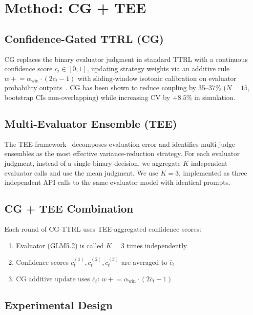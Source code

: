 \documentclass[11pt]{article}
\begin{document}
\section{Method: CG + TEE}

\subsection{Confidence-Gated TTRL (CG)}

CG replaces the binary evaluator judgment in standard TTRL with a continuous confidence score $c_t \in [0,1]$, updating strategy weights via an additive rule $w \mathrel{+}= \alpha_{\text{win}} \cdot (2c_t - 1)$ with sliding-window isotonic calibration on evaluator probability outputs~\cite{liu2026caleffects}. CG has been shown to reduce coupling by 35--37\% ($N{=}15$, bootstrap CIs non-overlapping) while increasing CV by $+8.5\%$ in simulation.

\subsection{Multi-Evaluator Ensemble (TEE)}

The TEE framework~\cite{messing2026tee} decomposes evaluation error and identifies multi-judge ensembles as the most effective variance-reduction strategy. For each evaluator judgment, instead of a single binary decision, we aggregate $K$ independent evaluator calls and use the mean judgment. We use $K{=}3$, implemented as three independent API calls to the same evaluator model with identical prompts.

\subsection{CG + TEE Combination}

Each round of CG-TTRL uses TEE-aggregated confidence scores:
\begin{enumerate}[leftmargin=*,nosep]
 \item Evaluator (GLM5.2) is called $K{=}3$ times independently
 \item Confidence scores $c_t^{(1)}, c_t^{(2)}, c_t^{(3)}$ are averaged to $\bar{c}_t$
 \item CG additive update uses $\bar{c}_t$: $w \mathrel{+}= \alpha_{\text{win}} \cdot (2\bar{c}_t - 1)$
\end{enumerate}

\subsection{Experimental Design}
\end{document}
